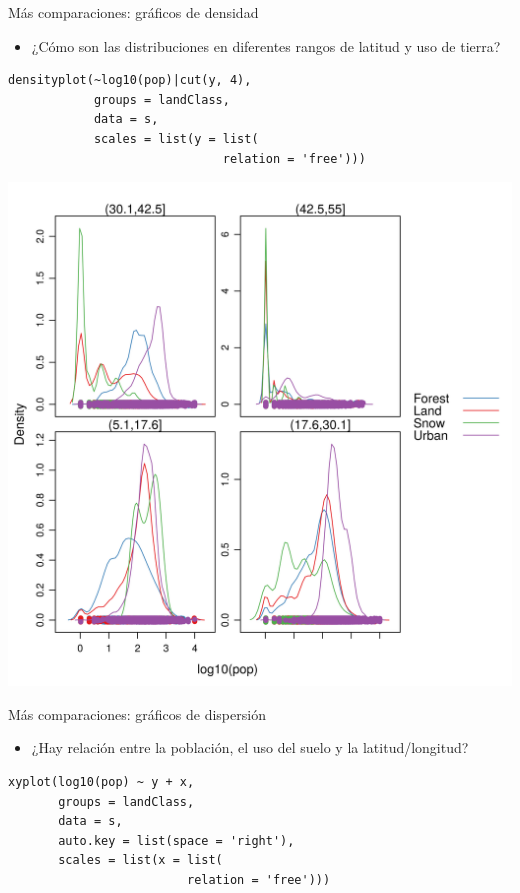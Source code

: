 \documentclass[xcolor={usenames,svgnames,dvipsnames}]{beamer}
\begin{document}
\begin{frame}[fragile,label=sec-3-3-5]{Más comparaciones: gráficos de densidad}
 \begin{itemize}
\item ¿Cómo son las distribuciones en diferentes rangos de latitud y uso de tierra?
\end{itemize}
\lstset{language=R,label= ,caption= ,numbers=none}
\begin{lstlisting}
densityplot(~log10(pop)|cut(y, 4),
            groups = landClass,
            data = s,
            scales = list(y = list(
                              relation = 'free')))
\end{lstlisting}
\end{frame}
\begin{frame}[label=sec-3-3-6]{}
\includegraphics[width=.9\linewidth]{figs/densityplotLandClass.png}
\end{frame}

\begin{frame}[fragile,label=sec-3-3-7]{Más comparaciones: gráficos de dispersión}
 \begin{itemize}
\item ¿Hay relación entre la población, el uso del suelo y la latitud/longitud?
\end{itemize}
\lstset{language=R,label= ,caption= ,numbers=none}
\begin{lstlisting}
xyplot(log10(pop) ~ y + x,
       groups = landClass,
       data = s,
       auto.key = list(space = 'right'),
       scales = list(x = list(
                         relation = 'free')))
\end{lstlisting}
\end{frame}
\end{document}
